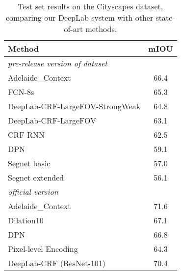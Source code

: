 \documentclass[10pt,journal,compsoc]{IEEEtran}
\begin{document}
\begin{table}[!t]
  \centering
  \addtolength{\tabcolsep}{2.5pt}
  \begin{tabular}{l | c}
    \toprule[0.2 em]
    {\bf Method} & {\bf mIOU} \\
    \toprule[0.2 em]
    \multicolumn{2}{l}{\it pre-release version of dataset} \\
    Adelaide\_Context \cite{lin2015efficient} & 66.4 \\
    FCN-8s \cite{long2014fully} & 65.3 \\
    \midrule
    DeepLab-CRF-LargeFOV-StrongWeak \cite{papandreou2015weakly} & 64.8 \\
    DeepLab-CRF-LargeFOV \cite{chen2014semantic} & 63.1 \\
    \midrule
    CRF-RNN \cite{zheng2015conditional} & 62.5 \\
    DPN \cite{liu2015semantic} & 59.1 \\
    Segnet basic \cite{badrinarayanan2015segnet} & 57.0 \\
    Segnet extended \cite{badrinarayanan2015segnet} & 56.1 \\
    \midrule \midrule
    \multicolumn{2}{l}{\it official version} \\
    Adelaide\_Context \cite{lin2015efficient} & 71.6 \\
    Dilation10 \cite{yu2015multi} & 67.1 \\
    DPN \cite{liu2015semantic} & 66.8  \\
    Pixel-level Encoding \cite{uhrig2016pixel} & 64.3 \\
    \midrule
    DeepLab-CRF (ResNet-101) & 70.4 \\
    \bottomrule[0.1 em]
  \end{tabular}
  \caption{Test set results on the Cityscapes dataset, comparing our DeepLab system with other state-of-art methods.}
  \label{tab:cityscapes_test}
\end{table}
\end{document}

